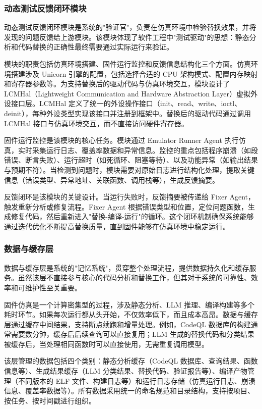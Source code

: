 \subsubsection{动态测试反馈闭环模块}

动态测试反馈闭环模块是系统的"验证官"，负责在仿真环境中检验替换效果，并将发现的问题反馈给上游模块。该模块体现了软件工程中"测试驱动"的思想：静态分析和代码替换的正确性最终需要通过实际运行来验证。

模块的职责包括仿真环境搭建、固件运行监控和反馈信息结构化三个方面。仿真环境搭建涉及 Unicorn 引擎的配置，包括选择合适的 CPU 架构模式、配置内存映射和寄存器参数等。为支持替换后的驱动代码与仿真环境交互，模块设计了 LCMHal（Lightweight Communication and Hardware Abstraction Layer）虚拟外设接口层。LCMHal 定义了统一的外设操作接口（init、read、write、ioctl、deinit），每种外设类型实现该接口并注册到框架中。替换后的驱动代码通过调用 LCMHal 接口与仿真环境交互，而不直接访问硬件寄存器。

固件运行监控是该模块的核心任务。模块通过 Emulator Runner Agent 执行仿真，实时采集运行日志、覆盖率数据和异常信息。监控的重点包括程序崩溃（如段错误、断言失败）、运行超时（如死循环、阻塞等待）、以及功能异常（如输出结果与预期不符）。当检测到问题时，模块需要对原始日志进行结构化处理，提取关键信息（错误类型、异常地址、关联函数、调用栈等），生成反馈摘要。

反馈闭环是该模块的关键设计。当运行失败时，反馈摘要被传递给 Fixer Agent，触发重新分析或修复流程。Fixer Agent 根据错误类型和位置，定位问题函数，生成修复代码，然后重新进入"替换-编译-运行"的循环。这个闭环机制确保系统能够通过迭代优化不断提高替换质量，直到固件能够在仿真环境中稳定运行。

\subsubsection{数据与缓存层}

数据与缓存层是系统的"记忆系统"，贯穿整个处理流程，提供数据持久化和缓存服务。虽然该层不直接参与核心的代码分析和替换工作，但其对于系统的可靠性、效率和可维护性至关重要。

固件仿真是一个计算密集型的过程，涉及静态分析、LLM 推理、编译构建等多个耗时环节。如果每次运行都从头开始，不仅效率低下，而且成本高昂。数据与缓存层通过缓存中间结果，支持断点续跑和增量处理。例如，CodeQL 数据库的构建通常需要数分钟，缓存后后续查询可以直接复用；LLM 生成的替换代码和分类结果被缓存后，当处理相同函数时可以直接使用，无需重复调用模型。

该层管理的数据包括四个类别：静态分析缓存（CodeQL 数据库、查询结果、函数信息等）、生成结果缓存（LLM 分类结果、替换代码、验证报告等）、编译产物管理（不同版本的 ELF 文件、构建日志等）和运行日志存储（仿真运行日志、崩溃信息、覆盖率数据等）。所有数据采用统一的命名规范和目录结构，支持按项目、按任务、按时间戳进行组织。

